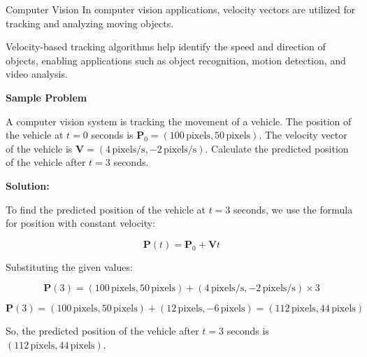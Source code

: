 \documentclass{beamer}
\begin{document}
\begin{frame}[t]{Computer Vision}
\vspace{15pt}
In computer vision applications, velocity vectors are utilized for tracking and analyzing moving objects.

Velocity-based tracking algorithms help identify the speed and direction of objects, enabling applications such as object recognition, motion detection, and video analysis.

\vspace{16pt}

\textbf{Sample Problem}

A computer vision system is tracking the movement of a vehicle. The position of the vehicle at $t = 0$ seconds is $\mathbf{P}_0 = (100 \, \text{pixels}, 50 \, \text{pixels})$. The velocity vector of the vehicle is $\mathbf{V} = (4 \, \text{pixels/s}, -2 \, \text{pixels/s})$. Calculate the predicted position of the vehicle after $t = 3$ seconds.


\end{frame}

\begin{frame}[plain]

\textbf{Solution:}

To find the predicted position of the vehicle at $t = 3$ seconds, we use the formula for position with constant velocity:

\[ \mathbf{P}(t) = \mathbf{P}_0 + \mathbf{V} t \]

Substituting the given values:

\[ \mathbf{P}(3) = (100 \, \text{pixels}, 50 \, \text{pixels}) + (4 \, \text{pixels/s}, -2 \, \text{pixels/s}) \times 3 \]

\[ \mathbf{P}(3) = (100 \, \text{pixels}, 50 \, \text{pixels}) + (12 \, \text{pixels}, -6 \, \text{pixels}) 
= (112 \, \text{pixels}, 44 \, \text{pixels}) \]

So, the predicted position of the vehicle after $t = 3$ seconds is $(112 \, \text{pixels}, 44 \, \text{pixels})$.
\end{frame}
\end{document}
